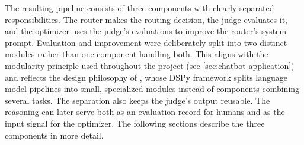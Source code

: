 The resulting pipeline consists of three components with clearly separated responsibilities. The router makes the routing decision, the judge evaluates it, and the optimizer uses the judge's evaluations to improve the router's system prompt. Evaluation and improvement were deliberately split into two distinct modules rather than one component handling both. This aligns with the modularity principle used throughout the project (see \cref{sec:chatbot-application}) and reflects the design philosophy of \textcite{khattab2024dspy}, whose DSPy framework splits language model pipelines into small, specialized modules instead of components combining several tasks. The separation also keeps the judge's output reusable. The reasoning can later serve both as an evaluation record for humans and as the input signal for the optimizer. The following sections describe the three components in more detail.
